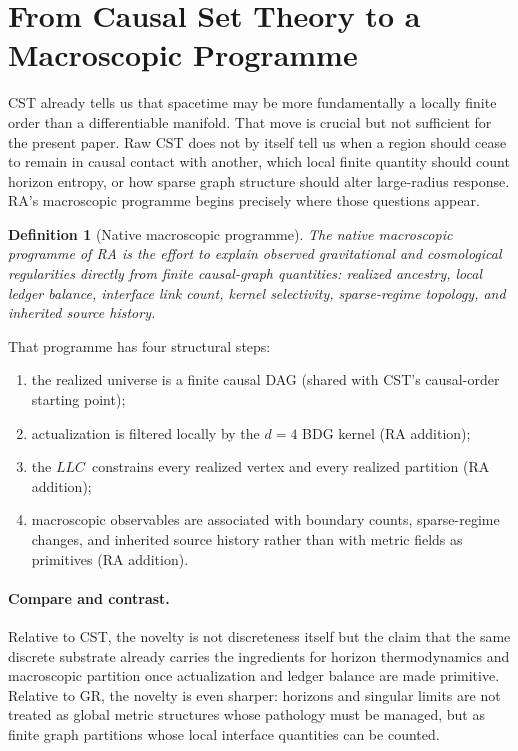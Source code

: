 \documentclass[11pt]{article}
\def\mathrm#1{#1}%
\newtheorem{definition}{Definition}
\newcommand{\LLC}{\ensuremath{\mathrm{LLC}}}
\begin{document}
\section{From Causal Set Theory to a Macroscopic Programme}

CST already tells us that spacetime may be more fundamentally a locally finite order than a differentiable manifold. That move is crucial but not sufficient for the present paper. Raw CST does not by itself tell us when a region should cease to remain in causal contact with another, which local finite quantity should count horizon entropy, or how sparse graph structure should alter large-radius response. RA's macroscopic programme begins precisely where those questions appear.

\begin{definition}[Native macroscopic programme]
The \emph{native macroscopic programme} of RA is the effort to explain observed gravitational and cosmological regularities directly from finite causal-graph quantities: realized ancestry, local ledger balance, interface link count, kernel selectivity, sparse-regime topology, and inherited source history.
\end{definition}

That programme has four structural steps:
\begin{enumerate}[nosep]
    \item the realized universe is a finite causal DAG (shared with CST's causal-order starting point);
    \item actualization is filtered locally by the $d=4$ BDG kernel (RA addition);
    \item the \LLC\ constrains every realized vertex and every realized partition (RA addition);
    \item macroscopic observables are associated with boundary counts, sparse-regime changes, and inherited source history rather than with metric fields as primitives (RA addition).
\end{enumerate}

\paragraph{Compare and contrast.} Relative to CST, the novelty is not discreteness itself but the claim that the same discrete substrate already carries the ingredients for horizon thermodynamics and macroscopic partition once actualization and ledger balance are made primitive. Relative to GR, the novelty is even sharper: horizons and singular limits are not treated as global metric structures whose pathology must be managed, but as finite graph partitions whose local interface quantities can be counted.
\end{document}
